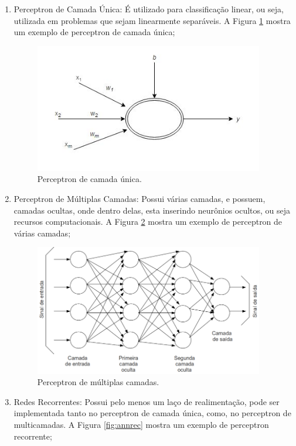 \begin {enumerate}
\item Perceptron de Camada Única: É utilizado para classificação linear, ou seja, utilizada em problemas que sejam linearmente separáveis. A Figura \ref{fig:ann1} mostra um exemplo de perceptron de camada única;
\begin{figure}[H]
\centering %
\includegraphics[width=10cm]{img/rna1.jpg} %
\caption{Perceptron de camada única.}
\label{fig:ann1}
\end{figure}
\item Perceptron de Múltiplas Camadas: Possui várias camadas, e possuem, camadas ocultas, onde dentro delas, esta inserindo neurônios ocultos, ou seja recursos computacionais.  A Figura \ref{fig:annm} mostra um exemplo de perceptron de várias camadas;

\begin{figure}[H]
\centering %
\includegraphics[width=10cm]{img/annm.png} %
\caption{Perceptron de múltiplas camadas.}
\label{fig:annm}
\end{figure}

\item Redes Recorrentes: Possui pelo menos um laço de realimentação, pode ser implementada tanto no perceptron de camada única,  como, no perceptron de multicamadas.  A Figura \ref{fig:annrec} mostra um exemplo de perceptron recorrente;


\end{enumerate}
